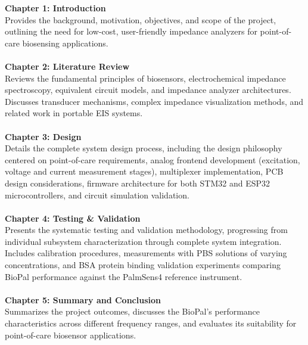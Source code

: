 \textbf{\large Chapter 1: Introduction} \\
Provides the background, motivation, objectives, and scope of the project, outlining the need for low-cost, user-friendly impedance analyzers for point-of-care biosensing applications.
\\\\
\textbf{\large Chapter 2: Literature Review} \\
Reviews the fundamental principles of biosensors, electrochemical impedance spectroscopy, equivalent circuit models, and impedance analyzer architectures. Discusses transducer mechanisms, complex impedance visualization methods, and related work in portable EIS systems.
\\\\
\textbf{\large Chapter 3: Design} \\
Details the complete system design process, including the design philosophy centered on point-of-care requirements, analog frontend development (excitation, voltage and current measurement stages), multiplexer implementation, PCB design considerations, firmware architecture for both STM32 and ESP32 microcontrollers, and circuit simulation validation.
\\\\
\textbf{\large Chapter 4: Testing \& Validation} \\
Presents the systematic testing and validation methodology, progressing from individual subsystem characterization through complete system integration. Includes calibration procedures, measurements with PBS solutions of varying concentrations, and BSA protein binding validation experiments comparing BioPal performance against the PalmSens4 reference instrument.
\\\\
\textbf{\large Chapter 5: Summary and Conclusion} \\
Summarizes the project outcomes, discusses the BioPal's performance characteristics across different frequency ranges, and evaluates its suitability for point-of-care biosensor applications.

